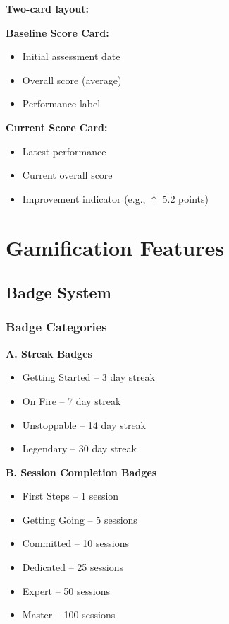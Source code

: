 \documentclass[12pt,a4paper]{article}
\begin{document}
\textbf{Two-card layout:}

\textbf{Baseline Score Card:}
\begin{itemize}
    \item Initial assessment date
    \item Overall score (average)
    \item Performance label
\end{itemize}

\textbf{Current Score Card:}
\begin{itemize}
    \item Latest performance
    \item Current overall score
    \item Improvement indicator (e.g., $\uparrow$ 5.2 points)
\end{itemize}

\section{Gamification Features}

\subsection{Badge System}

\subsubsection{Badge Categories}

\textbf{A. Streak Badges}
\begin{itemize}
    \item Getting Started -- 3 day streak
    \item On Fire -- 7 day streak
    \item Unstoppable -- 14 day streak
    \item Legendary -- 30 day streak
\end{itemize}

\textbf{B. Session Completion Badges}
\begin{itemize}
    \item First Steps -- 1 session
    \item Getting Going -- 5 sessions
    \item Committed -- 10 sessions
    \item Dedicated -- 25 sessions
    \item Expert -- 50 sessions
    \item Master -- 100 sessions
\end{itemize}
\end{document}
